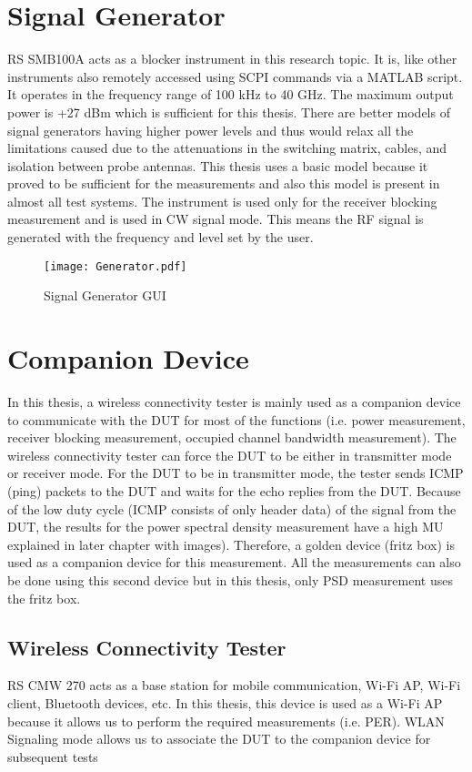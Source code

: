 \section{Signal Generator}
\acs{RS}\textregistered{} SMB100A acts as a blocker instrument in this research topic. It is, like other instruments also remotely accessed using \acs{SCPI} commands via a MATLAB\textregistered{} script. It operates in the frequency range of 100 kHz to 40 GHz. The maximum output power is +27 dBm which is sufficient for this thesis. There are better models of signal generators having higher power levels and thus would relax all the limitations caused due to the attenuations in the switching matrix, cables, and isolation between probe antennas. This thesis uses a basic model because it proved to be sufficient for the measurements and also this model is present in almost all test systems. The instrument is used only for the receiver blocking measurement and is used in \acs{CW} signal mode. This means the \acs{RF} signal is generated with the frequency and level set by the user.

\begin{figure}[H]
\centering
\texttt{[image: Generator.pdf]}
\caption{Signal Generator \acs{GUI}}
\label{fig:gen}
\end{figure}

\section{Companion Device}
In this thesis, a wireless connectivity tester is mainly used as a companion device to communicate with the \acs{DUT} for most of the functions (i.e. power measurement, receiver blocking measurement, occupied channel bandwidth measurement). The wireless connectivity tester can force the \acs{DUT} to be either in transmitter mode or receiver mode. For the \acs{DUT} to be in transmitter mode, the tester sends \acf{ICMP} (ping) packets to the \acs{DUT} and waits for the echo replies from the \acs{DUT}. Because of the low duty cycle (\acs{ICMP} consists of only header data) of the signal from the \acs{DUT}, the results for the power spectral density measurement have a high \ac{MU} explained in later chapter with images). Therefore, a golden device (fritz box) is used as a companion device for this measurement. All the measurements can also be done using this second device but in this thesis, only \ac{PSD} measurement uses the fritz box.

\subsection{Wireless Connectivity Tester} \label{sec:cmw}
\acs{RS}\textregistered{} CMW 270 acts as a base station for mobile communication, Wi-Fi\texttrademark{} \acs{AP}, Wi-Fi\texttrademark{} client, Bluetooth\textregistered{} devices, etc. In this thesis, this device is used as a Wi-Fi\texttrademark{} \acs{AP} because it allows us to perform the required measurements (i.e. \acf{PER}). \acs{WLAN} Signaling mode allows us to associate the \acs{DUT} to the companion device for subsequent tests

